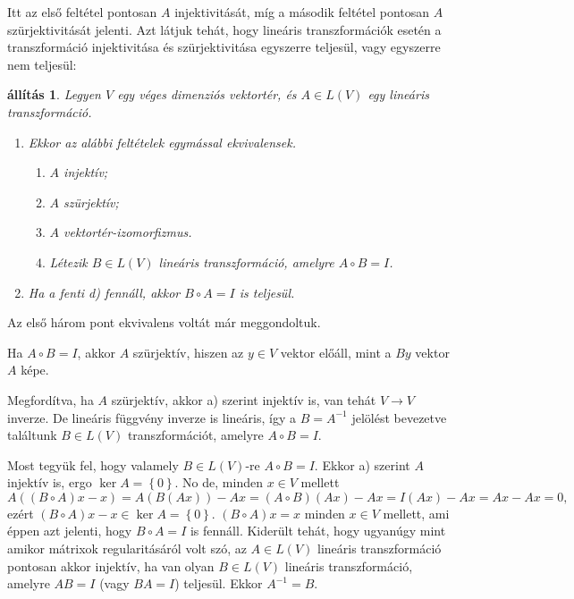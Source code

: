 \documentclass[a4paper, showtrims]{memoir}
\makeatletter
\renewenvironment{proof}[1][\proofname]
    {\par\pushQED{\qed}%
    \normalfont \topsep6\p@\@plus6\p@\relax
    \trivlist
    \item[\hskip\labelsep
        \itshape
    #1\@addpunct{:}]\ignorespaces}
    {\popQED\endtrivlist\@endpefalse}
\theoremstyle{plain}
\newtheorem{proposition}{állítás}[chapter]
\theoremstyle{remark}
\theoremstyle{definition}
\makeatother
\begin{document}
Itt az első feltétel pontosan $A$ injektivitását,
míg a második feltétel pontosan $A$ szürjektivitását jelenti.
Azt látjuk tehát,
hogy lineáris transzformációk esetén a transzformáció injektivitása és szürjektivitása egyszerre teljesül,
vagy egyszerre nem teljesül:
\begin{proposition}
	Legyen $V$ egy véges dimenziós vektortér, és $A\in L\left( V \right)$ egy lineáris transzformáció.
	\begin{enumerate}
		\item
		      Ekkor az alábbi feltételek egymással ekvivalensek.
		      \begin{enumerate}
			      \item $A$ injektív;
			      \item $A$ szürjektív;
			      \item $A$ vektortér-izomorfizmus.
			      \item Létezik $B\in L\left( V \right)$ lineáris transzformáció, amelyre $A\circ B=I$.
		      \end{enumerate}
		\item
		      Ha a fenti d) fennáll, akkor $B\circ A=I$ is teljesül.\qedhere
	\end{enumerate}
\end{proposition}
\begin{proof}
	Az első három pont ekvivalens voltát már meggondoltuk.

	Ha $A\circ B=I$, akkor $A$ szürjektív, hiszen az $y\in V$ vektor előáll,
	mint a $By$ vektor $A$ képe.

	Megfordítva, ha $A$ szürjektív, akkor a) szerint injektív is, van tehát $V\to V$ inverze.
	De lineáris függvény inverze is lineáris,
	így a $B=A^{-1}$ jelölést bevezetve találtunk $B\in L\left( V \right)$
	transzformációt, amelyre $A\circ B=I$.

	Most tegyük fel, hogy valamely $B\in L\left( V \right)$-re $A\circ B=I$.
	Ekkor a) szerint $A$ injektív is, ergo $\ker A=\left\{ 0 \right\}$.
	No de, minden $x\in V$ mellett
	\[
		A\left( (B\circ A)x-x \right)
		=
		A\left( B\left( Ax \right) \right)-Ax
		=
		\left( A\circ B \right)\left( Ax \right)-Ax
		=
		I\left( Ax \right)-Ax
		=
		Ax-Ax=0,
	\]
	ezért $(B\circ A)x-x\in\ker A=\left\{ 0 \right\}$.
	$(B\circ A)x=x$ minden $x\in V$ mellett, ami éppen azt jelenti, hogy $B\circ A=I$ is fennáll.
\end{proof}
Kiderült tehát, hogy ugyanúgy mint amikor mátrixok regularitásáról volt szó,
az $A\in L\left( V \right)$ lineáris transzformáció pontosan akkor injektív,
ha van olyan $B\in L\left( V \right)$ lineáris transzformáció,
amelyre $AB=I$ (vagy $BA=I$) teljesül.
Ekkor $A^{-1}=B$.
\end{document}
